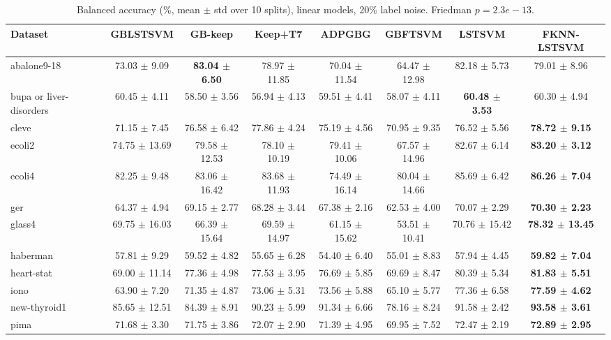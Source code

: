 \begin{table}[t]
\centering\small
\caption{Balanced accuracy (\%, mean $\pm$ std over 10 splits), linear models, 20\% label noise. Friedman $p = 2.3e-13$.}
\begin{tabular}{lccccccc}
\toprule
Dataset & GBLSTSVM & GB-keep & Keep+T7 & ADPGBG & GBFTSVM & LSTSVM & FKNN-LSTSVM \\
\midrule
abalone9-18 & 73.03 $\pm$ 9.09 & \textbf{83.04 $\pm$ 6.50} & 78.97 $\pm$ 11.85 & 70.04 $\pm$ 11.54 & 64.47 $\pm$ 12.98 & 82.18 $\pm$ 5.73 & 79.01 $\pm$ 8.96 \\
bupa or liver-disorders & 60.45 $\pm$ 4.11 & 58.50 $\pm$ 3.56 & 56.94 $\pm$ 4.13 & 59.51 $\pm$ 4.41 & 58.07 $\pm$ 4.11 & \textbf{60.48 $\pm$ 3.53} & 60.30 $\pm$ 4.94 \\
cleve & 71.15 $\pm$ 7.45 & 76.58 $\pm$ 6.42 & 77.86 $\pm$ 4.24 & 75.19 $\pm$ 4.56 & 70.95 $\pm$ 9.35 & 76.52 $\pm$ 5.56 & \textbf{78.72 $\pm$ 9.15} \\
ecoli2 & 74.75 $\pm$ 13.69 & 79.58 $\pm$ 12.53 & 78.10 $\pm$ 10.19 & 79.41 $\pm$ 10.06 & 67.57 $\pm$ 14.96 & 82.67 $\pm$ 6.14 & \textbf{83.20 $\pm$ 3.12} \\
ecoli4 & 82.25 $\pm$ 9.48 & 83.06 $\pm$ 16.42 & 83.68 $\pm$ 11.93 & 74.49 $\pm$ 16.14 & 80.04 $\pm$ 14.66 & 85.69 $\pm$ 6.42 & \textbf{86.26 $\pm$ 7.04} \\
ger & 64.37 $\pm$ 4.94 & 69.15 $\pm$ 2.77 & 68.28 $\pm$ 3.44 & 67.38 $\pm$ 2.16 & 62.53 $\pm$ 4.00 & 70.07 $\pm$ 2.29 & \textbf{70.30 $\pm$ 2.23} \\
glass4 & 69.75 $\pm$ 16.03 & 66.39 $\pm$ 15.64 & 69.59 $\pm$ 14.97 & 61.15 $\pm$ 15.62 & 53.51 $\pm$ 10.41 & 70.76 $\pm$ 15.42 & \textbf{78.32 $\pm$ 13.45} \\
haberman & 57.81 $\pm$ 9.29 & 59.52 $\pm$ 4.82 & 55.65 $\pm$ 6.28 & 54.40 $\pm$ 6.40 & 55.01 $\pm$ 8.83 & 57.94 $\pm$ 4.45 & \textbf{59.82 $\pm$ 7.04} \\
heart-stat & 69.00 $\pm$ 11.14 & 77.36 $\pm$ 4.98 & 77.53 $\pm$ 3.95 & 76.69 $\pm$ 5.85 & 69.69 $\pm$ 8.47 & 80.39 $\pm$ 5.34 & \textbf{81.83 $\pm$ 5.51} \\
iono & 63.90 $\pm$ 7.20 & 71.35 $\pm$ 4.87 & 73.06 $\pm$ 5.31 & 73.56 $\pm$ 5.88 & 65.10 $\pm$ 5.77 & 77.36 $\pm$ 6.58 & \textbf{77.59 $\pm$ 4.62} \\
new-thyroid1 & 85.65 $\pm$ 12.51 & 84.39 $\pm$ 8.91 & 90.23 $\pm$ 5.99 & 91.34 $\pm$ 6.66 & 78.16 $\pm$ 8.24 & 91.58 $\pm$ 2.42 & \textbf{93.58 $\pm$ 3.61} \\
pima & 71.68 $\pm$ 3.30 & 71.75 $\pm$ 3.86 & 72.07 $\pm$ 2.90 & 71.39 $\pm$ 4.95 & 69.95 $\pm$ 7.52 & 72.47 $\pm$ 2.19 & \textbf{72.89 $\pm$ 2.95} \\

\end{tabular}
\end{table}
